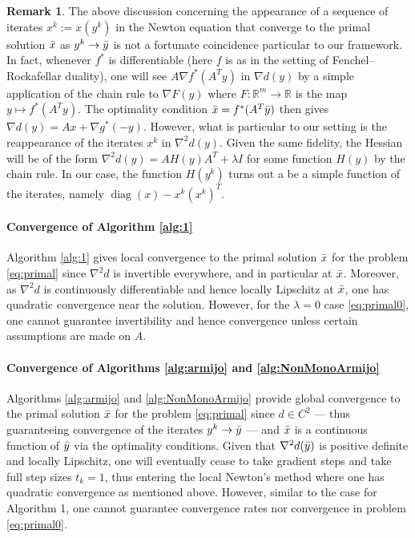 \documentclass[10pt,a4paper]{article}
\numberwithin{equation}{section}
\theoremstyle{definition}
\newtheorem{remark}[theorem]{Remark}
\def\rr{{\mathbb R}}
\DeclareMathOperator{\diag}{diag}
\begin{document}
\begin{remark}
    The above discussion concerning the appearance of a sequence of iterates $x^k := x(y^k)$ in the Newton equation that converge to the primal solution $\Bar{x}$ as $y^k \to \Bar{y}$ is not a fortunate coincidence particular to our framework. In fact, whenever $f^{\ast}$ is differentiable (here $f$ is as in the setting of Fenchel--Rockafellar duality), one will see $A \nabla f^\ast(A^Ty)$ in $\nabla d(y)$ by a simple application of the chain rule to $\nabla F(y)$ where $F: \rr^m \to \rr$ is the map $y \mapsto f^\ast(A^Ty)$. The optimality condition $\Bar{x} = f^\ast(A^T \Bar{y})$ then gives $\nabla d(y) = Ax + \nabla g^\ast(-y)$. However, what is particular to our setting is the reappearance of the iterates $x^k$ in $\nabla^2 d(y)$. Given the same fidelity, the Hessian will be of the form $\nabla^2 d(y) = AH(y)A^T + \lambda I$ for some function $H(y)$ by the chain rule. In our case, the function $H(y^k)$ turns out a be a simple function of the iterates, namely $\diag(x) - x^k(x^k)^T$.
\end{remark}

\paragraph{Convergence of Algorithm \ref{alg:1}} Algorithm \ref{alg:1} gives local convergence to the primal solution $\Bar{x}$ for the problem \eqref{eq:primal} since $\nabla^2d$ is invertible everywhere, and in particular at $\Bar{x}$. Moreover, as $\nabla^2 d$ is continuously differentiable and hence locally Lipschitz at $\Bar{x}$, one has quadratic convergence near the solution. However, for the $\lambda=0$ case \eqref{eq:primal0}, one cannot guarantee invertibility and hence convergence unless certain assumptions are made on $A$. 

\paragraph{Convergence of Algorithms \ref{alg:armijo} and \ref{alg:NonMonoArmijo}} Algorithms \ref{alg:armijo} and \ref{alg:NonMonoArmijo} provide global convergence to the primal solution $\Bar{x}$ for the problem \eqref{eq:primal} since $d \in C^2$ --- thus guaranteeing convergence of the iterates $y^k \to \Bar{y}$ --- and $\Bar{x}$ is a continuous function of $\Bar{y}$ via the optimality conditions. Given that $\nabla^2 d(\Bar{y})$ is positive definite and locally Lipschitz, one will eventually cease to take gradient steps and take full step sizes $t_k = 1$, thus entering the local Newton's method where one has quadratic convergence as mentioned above. However, similar to the case for Algorithm 1, one cannot guarantee convergence rates nor convergence in problem \eqref{eq:primal0}.
\end{document}
